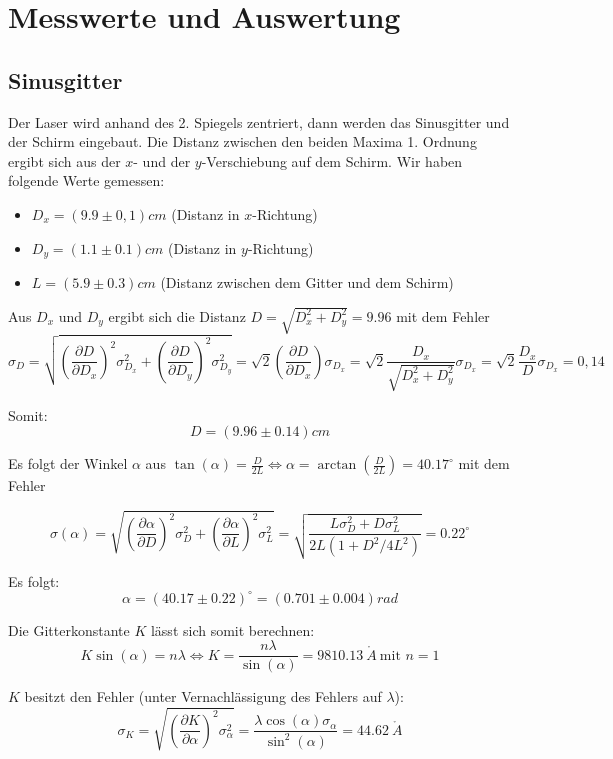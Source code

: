\section{Messwerte und Auswertung}

\subsection{Sinusgitter} %

Der Laser wird anhand des 2. Spiegels zentriert, dann werden das Sinusgitter und der Schirm eingebaut. Die Distanz zwischen den beiden Maxima 1. Ordnung ergibt sich aus der $x$- und der $y$-Verschiebung auf dem Schirm. Wir haben folgende Werte gemessen:
\begin{itemize}
\item $D_x = (9.9 \pm 0,1) cm$ (Distanz in $x$-Richtung)
\item $D_y = (1.1 \pm 0.1) cm$ (Distanz in $y$-Richtung)
\item $L = (5.9 \pm 0.3) cm$ (Distanz zwischen dem Gitter und dem Schirm)
\end{itemize}

Aus $D_x$ und $D_y$ ergibt sich die Distanz $D=\sqrt{D_x^2 + D_y^2} = 9.96$ mit dem Fehler
$$\sigma_D = \sqrt{\left(\frac{\partial D}{\partial D_x}\right)^2\sigma_{D_x}^2 + \left(\frac{\partial D}{\partial D_y}\right)^2\sigma_{D_y}^2} = \sqrt 2 \left(\frac{\partial D}{\partial D_x}\right)\sigma_{D_x} = \sqrt 2 \frac{D_x}{\sqrt{D_x^2 + D_y^2}}\sigma_{D_x} = \sqrt 2 \frac{D_x}{D}\sigma_{D_x} = 0,14$$

Somit: $$\boxed{D = (9.96 \pm 0.14) cm}$$

Es folgt der Winkel $\alpha$ aus $\tan(\alpha) = \frac{D}{2L} \Leftrightarrow\alpha = \arctan\left(\frac{D}{2L}\right) = 40.17^\circ$ mit dem Fehler

$$\sigma(\alpha) = \sqrt{\left(\frac{\partial \alpha}{\partial D}\right)^2\sigma_{D}^2 + \left(\frac{\partial \alpha}{\partial L}\right)^2\sigma_{L}^2} = \sqrt{\frac{L\sigma_D^2 + D\sigma_L^2}{2L(1+D^2/4L^2)}} = 0.22^\circ$$

Es folgt: $$\boxed{\alpha = (40.17 \pm 0.22)^\circ = (0.701 \pm 0.004) rad} $$

Die Gitterkonstante $K$ l\"asst sich somit berechnen: $$ K\sin(\alpha) = n\lambda \Leftrightarrow K = \frac{n\lambda}{\sin(\alpha)} = 9810.13 \ \mathring A \ \text{mit \ } n=1$$

$K$ besitzt den Fehler (unter Vernachl\"assigung des Fehlers auf $\lambda$): $$\sigma_K = \sqrt{\left(\frac{\partial K}{\partial \alpha}\right)^2\sigma_\alpha^2} = \frac{\lambda\cos(\alpha)\sigma_\alpha}{\sin^2(\alpha)} = 44.62 \ \mathring A$$

